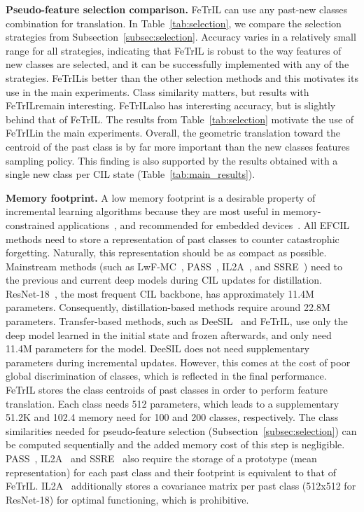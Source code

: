 \documentclass[10pt,twocolumn,letterpaper]{article}
\makeatletter
\newcommand{\ourmodel}{FeTrIL\@\xspace}
\newcommand{\ourmodelNospace}{FeTrIL}
\makeatother
\begin{document}
\textbf{Pseudo-feature selection comparison.}
\ourmodel can use any past-new classes combination for translation.
In Table~\ref{tab:selection}, we compare the selection strategies from Subsection~\ref{subsec:selection}.
Accuracy varies in a relatively small range for all strategies, indicating that \ourmodel is robust to the way features of new classes are selected, and it can be successfully implemented with any of the strategies. 
\ourmodelNospace is better than the other selection methods and this motivates its use in the main experiments.
Class similarity matters, but results with \ourmodelNospace remain interesting.
\ourmodelNospace also has interesting accuracy, but is slightly behind that of \ourmodelNospace.
The results from Table~\ref{tab:selection} motivate the use of \ourmodelNospace in the main experiments.
Overall, the geometric translation toward the centroid of the past class is by far more important than the new classes features sampling policy.
This finding is also supported by the results obtained with a single new class per CIL state (Table~\ref{tab:main_results}).


\textbf{Memory footprint.} 
A low memory footprint is a desirable property of incremental learning algorithms because they are most useful in memory-constrained applications~\cite{masana2021_study,ravaglia2021tinyml,rebuffi2017_icarl}, and recommended for embedded devices~\cite{hayes2022online}.
All EFCIL methods need to store a representation of past classes to counter catastrophic forgetting. 
Naturally, this representation should be as compact as possible. 
Mainstream methods (such as LwF-MC~\cite{li2016_lwf}, PASS~\cite{zhu2021pass}, IL2A~\cite{zhu2021pass}, and SSRE~\cite{zhu2022self}) need to the previous and current deep models during CIL updates for distillation.
ResNet-18~\cite{he2016_resnet}, the most frequent CIL backbone, has approximately 11.4M parameters. 
Consequently, distillation-based methods require around 22.8M parameters.
Transfer-based methods, such as DeeSIL~\cite{belouadah2018_deesil} and \ourmodel, use only the deep model learned in the initial state and frozen afterwards, and only need 11.4M parameters for the model.
DeeSIL does not need supplementary parameters during incremental updates.
However, this comes at the cost of poor global discrimination of classes, which is reflected in the final performance. 
\ourmodel stores the class centroids of past classes in order to perform feature translation.
Each class needs 512 parameters, which leads to a supplementary 51.2K and 102.4 memory need for 100 and 200 classes, respectively.
The class similarities needed for pseudo-feature selection (Subsection~\ref{subsec:selection}) can be computed sequentially and the added memory cost of this step is negligible.
PASS~\cite{zhu2021pass}, IL2A~\cite{zhu2021class} and SSRE~\cite{zhu2022self} also require the storage of a prototype (mean representation) for each past class and their footprint is equivalent to that of \ourmodel. 
IL2A~\cite{zhu2021class} additionally stores a covariance matrix per past class (512x512 for ResNet-18) for optimal functioning, which is prohibitive. 
\end{document}
